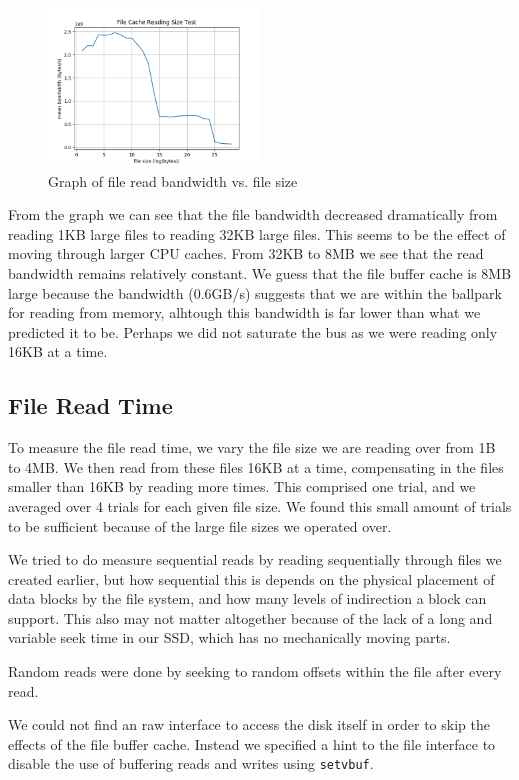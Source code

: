 \documentclass[letterpaper,twocolumn,10pt]{article}
\begin{document}
\begin{figure}
	\centering
    \includegraphics[width=0.5\textwidth]{graphs/file_cache}
  \caption{Graph of file read bandwidth vs. file size}
	\label{fig:filecache}
\end{figure}

From the graph we can see that the file bandwidth decreased dramatically from
reading 1KB large files to reading 32KB large files. This seems to be the effect
of moving through larger CPU caches. From 32KB to 8MB we see that the read
bandwidth remains relatively constant. We guess that the file buffer cache is
8MB large because the bandwidth (0.6GB/s) suggests that we are within the
ballpark for reading from memory, alhtough this bandwidth is far lower than
what we predicted it to be. Perhaps we did not saturate the bus as we were
reading only 16KB at a time.

\subsection{File Read Time}
To measure the file read time, we vary the file size we are reading over from
1B to 4MB. We then read from these files 16KB at a time, compensating in the
files smaller than 16KB by reading more times. This comprised one trial, and we
averaged over 4 trials for each given file size. We found this small amount of
trials to be sufficient because of the large file sizes we operated over.

We tried to do measure sequential reads by reading sequentially through files
we created earlier, but how sequential this is depends on the physical
placement of data blocks by the file system, and how many levels of indirection
a block can support. This also may not matter altogether because of the lack of
a long and variable seek time in our SSD, which has no mechanically moving
parts.

Random reads were done by seeking to random offsets within the file after every
read. 

We could not find an raw interface to access the disk itself in order to skip
the effects of the file buffer cache. Instead we specified a hint to the file
interface to disable the use of buffering reads and writes using
\texttt{setvbuf}.
\end{document}
